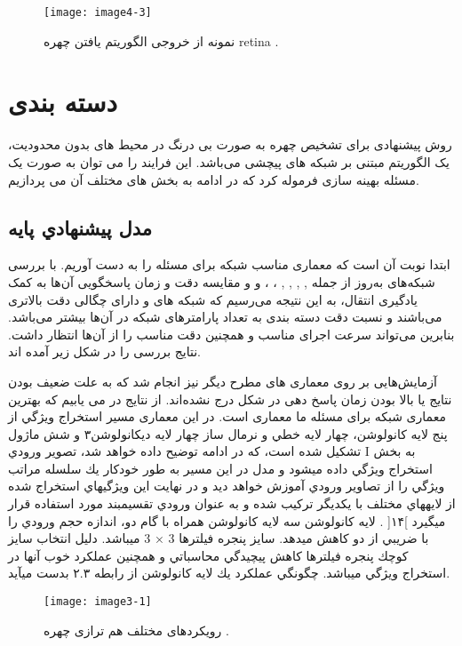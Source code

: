 \begin{figure}[h]
\centering
  \texttt{[image: image4-3]}
  \caption{نمونه از خروجی الگوریتم یافتن چهره retina \cite{deng2019retinaface}.}
  \label{image4-4}
\end{figure}

\section{دسته بندی}
روش پیشنهادی برای تشخیص چهره به صورت بی درنگ در محیط های بدون محدودیت، یک الگوریتم مبتنی بر شبکه های پیچشی می‌باشد. این فرایند را می توان به صورت یک مسئله بهینه سازی فرموله کرد که در ادامه به بخش های مختلف آن می پردازیم.

\subsection{مدل پيشنهادي پايه}
ابتدا نوبت آن است که معماری مناسب شبکه برای مسئله را به دست آوریم. با بررسی شبکه‌های به‌روز از جمله
,
,
,
,
،
،
و
و مقایسه دقت و زمان پاسخگویی آن‌ها به کمک یادگیری انتقال، به این نتیجه می‌رسیم که شبکه های  و  دارای چگالی دقت بالاتری می‌باشند و نسبت دقت دسته بندی به تعداد پارامترهای شبکه در آن‌ها بیشتر می‌باشد. بنابرین می‌تواند سرعت اجرای مناسب و همچنین دقت مناسب را از آن‌ها انتظار داشت. نتایج بررسی را در شکل زیر آمده اند.

آزمایش‌هایی بر روی معماری های مطرح دیگر نیز انجام شد که به علت ضعیف بودن نتایج یا بالا بودن زمان پاسخ دهی در شکل درج نشده‌اند. از نتایج در می یابیم که بهترین معماری شبکه برای مسئله ما معماری  است.
\noindent
در این معماری مسير استخراج ويژگي از پنج لايه كانولوشن، چهار لايه خطي و نرمال ساز چهار لايه ديكانولوشن۳ و شش ماژول  تشکیل شده است، كه در ادامه توضيح داده خواهد شد، تصوير ورودي I به بخش استخراج ويژگي داده ميشود و مدل در اين مسير به طور خودكار يك سلسله مراتب ويژگي را از تصاوير ورودي آموزش خواهد ديد و در نهايت اين ويژگيهاي استخراج شده از لايههاي مختلف با يكديگر تركيب شده و به عنوان ورودي تقسيمبند مورد استفاده قرار ميگيرد ]۱۴[ .
\noindent
لايه كانولوشن
سه لايه كانولوشن همراه با گام دو، اندازه حجم ورودي را با ضريبي از دو كاهش ميدهد. سايز پنجره فيلترها 3 × 3 ميباشد. دليل انتخاب سايز كوچك پنجره فيلترها كاهش پيچيدگي محاسباتي و همچنين عملكرد خوب آنها در استخراج ويژگي ميباشد. چگونگي عملكرد يك لايه كانولوشن از رابطه ۲.۳ بدست
ميآيد.
 \begin{figure}[h]
\centering
  \texttt{[image: image3-1]}
  \caption{رویکردهای مختلف هم ترازی چهره \cite{ref1}.}
  \label{image2-1}
\end{figure}


